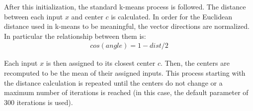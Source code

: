 After this initialization, the standard k-means process is followed. The distance between each input $x$ and center $c$ is calculated. In order for the Euclidean distance used in k-means to be meaningful, the vector directions are normalized. In particular the relationship between them is:
\begin{align}
cos(angle) = 1 - dist/2 
\end{align}

Each input $x$ is then assigned to its closest center $c$. Then, the centers are recomputed to be the mean of their assigned inputs. This process starting with the distance calculation is repeated until the centers do not change or a maximum number of iterations is reached (in this case, the default parameter of 300 iterations is used). 









